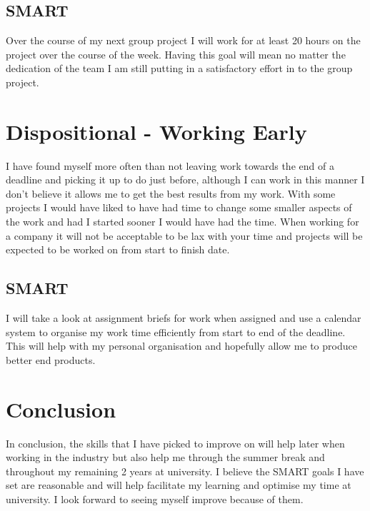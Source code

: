\documentclass{scrartcl}
\begin{document}
\subsection{SMART}
Over the course of my next group project I will work for at least 20 hours on the project over the course of the week. Having this goal will mean no matter the dedication of the team I am still putting in a satisfactory effort in to the group project.


\section{Dispositional - Working Early}
I have found myself more often than not leaving work towards the end of a deadline and picking it up to do just before, although I can work in this manner I don't believe it allows me to get the best results from my work. With some projects I would have liked to have had time to change some smaller aspects of the work and had I started sooner I would have had the time. When working for a company it will not be acceptable to be lax with your time and projects will be expected to be worked on from start to finish date. 
\subsection{SMART}
I will take a look at assignment briefs for work when assigned and use a calendar system to organise my work time efficiently from start to end of the deadline. This will help with my personal organisation and hopefully allow me to produce better end products.

\section{Conclusion}
In conclusion, the skills that I have picked to improve on will help later when working in the industry but also help me through the summer break and throughout my remaining 2 years at university. I believe the SMART goals I have set are reasonable and will help facilitate my learning and optimise my time at university. I look forward to seeing myself improve because of them.
\end{document}

